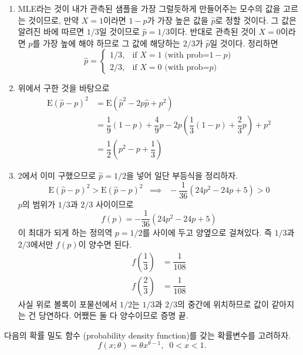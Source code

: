 \documentclass[answers]{exam}
\begin{document}
\begin{questions}
\begin{enumerate}
   \end{enumerate}
   \begin{solution}
    \begin{enumerate}
      \item MLE라는 것이 내가 관측된 샘플을 가장 그럴듯하게 만들어주는 모수의 값을 고르는 것이므로, 만약 $X=1$이라면 $1-p$가 가장 높은 값을 $\hat{p}$로 정할 것이다. 그 값은 알려진 바에 따르면 $1/3$일 것이므로 $\hat{p}=1/3$이다. 반대로 관측된 것이 $X=0$이라면 $p$를 가장 높에 해야 하므로 그 값에 해당하는 $2/3$가 $\hat{p}$일 것이다. 정리하면
      $$
        \hat{p}=\begin{cases}1/3, & \text{if $X=1$ (with prob=$1-p$)} \\ 2/3, & \text{if $X=0$ (with prob=$p$)} \end{cases}
      $$
      \item 위에서 구한 것을 바탕으로
      \begin{align}
        \mathrm{E}\left(\hat{p}-p\right)^{2}&= \mathrm{E}\left(\hat{p}^{2}-2p\hat{p}+p^{2}\right)\\
        &= \dfrac{1}{9}\left(1-p\right)+\dfrac{4}{9}p -2p\left(\dfrac{1}{3}\left(1-p\right)+\dfrac{2}{3}p\right)+p^{2}\\
        &= \dfrac{1}{2}\left(p^{2}-p+\dfrac{1}{3}\right)
      \end{align}
      \item 2에서 이미 구했으므로 $\overset{\sim}{p}=1/2$을 넣어 일단 부등식을 정리하자.
      $$
        \mathrm{E}\left(\hat{p}-p\right)^{2}>\mathrm{E}\left(\overset{\sim}{p}-p\right)^{2} \;\;\implies\;\; -\dfrac{1}{36}\left(24p^{2}-24p+5\right) > 0
      $$ 
      $p$의 범위가 $1/3$과 $2/3$ 사이이므로
      $$
        f\left(p\right) = -\dfrac{1}{36}\left(24p^{2}-24p+5\right)
      $$
      이 최대가 되게 하는 정의역 $p=1/2$를 사이에 두고 양옆으로 걸쳐있다. 즉 $1/3$과 $2/3$에서만 $f\left(p\right)$이 양수면 된다.
      \begin{align}
        f\left(\dfrac{1}{3}\right) &= \dfrac{1}{108}\\
        f\left(\dfrac{2}{3}\right) &= \dfrac{1}{108}
      \end{align}
      사실 위로 볼록이 포물선에서 $1/2$는 $1/3$과 $2/3$의 중간에 위치하므로 값이 같아지는 건 당연하다. 어쨌든 둘 다 양수이므로 증명 끝.
    \end{enumerate}
   \end{solution}
   \question
   다음의 확률 밀도 함수 (probability density function)를 갖는 확률변수를 고려하자.
   $$
    f\left(x;\theta\right)=\theta x^{\theta-1},\;\;0<x<1.
$$
\end{questions}
\end{document}
